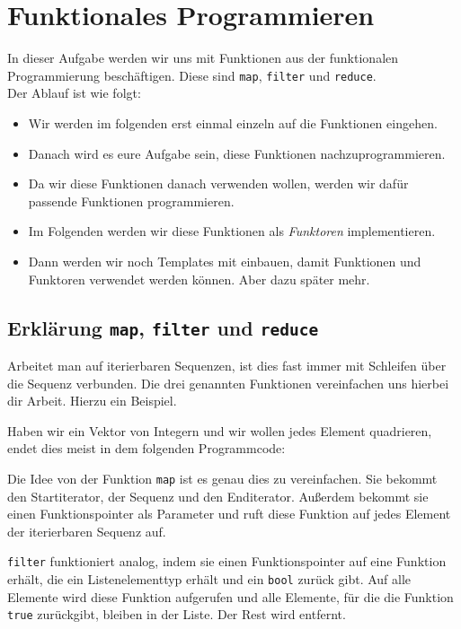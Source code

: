 \section{Funktionales Programmieren}

In dieser Aufgabe werden wir uns mit Funktionen aus der funktionalen Programmierung beschäftigen.
Diese sind \lstinline{map}, \lstinline{filter} und \lstinline{reduce}. \\

Der Ablauf ist wie folgt:
\begin{itemize}
    \item Wir werden im folgenden erst einmal einzeln auf die Funktionen eingehen.
    \item Danach wird es eure Aufgabe sein, diese Funktionen nachzuprogrammieren.
    \item Da wir diese Funktionen danach verwenden wollen, werden wir dafür passende Funktionen programmieren.
	\item Im Folgenden werden wir diese Funktionen als \emph{Funktoren} implementieren.
	\item Dann werden wir noch Templates mit einbauen, damit Funktionen und Funktoren verwendet werden können.
			Aber dazu später mehr.
\end{itemize}

\subsection{Erklärung \lstinline{map}, \lstinline{filter} und \lstinline{reduce}}

Arbeitet man auf iterierbaren Sequenzen, ist dies fast immer mit Schleifen über die Sequenz verbunden.
Die drei genannten Funktionen vereinfachen uns hierbei dir Arbeit.
Hierzu ein Beispiel.

Haben wir ein Vektor von Integern und wir wollen jedes Element quadrieren, endet dies meist in dem folgenden Programmcode:



Die Idee von der Funktion \lstinline{map} ist es genau dies zu vereinfachen.
Sie bekommt den Startiterator, der Sequenz und den Enditerator.
Außerdem bekommt sie einen Funktionspointer als Parameter und ruft diese Funktion auf jedes Element der iterierbaren Sequenz auf.



\lstinline{filter} funktioniert analog, indem sie einen Funktionspointer auf eine Funktion erhält, die ein Listenelementtyp erhält und ein \lstinline{bool} zurück gibt.
Auf alle Elemente wird diese Funktion aufgerufen und alle Elemente, für die die Funktion \lstinline{true} zurückgibt, bleiben in der Liste. Der Rest wird entfernt. \\

